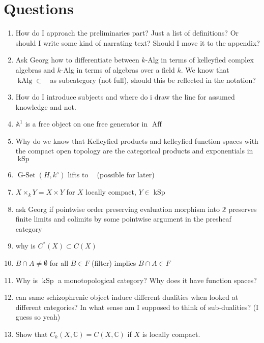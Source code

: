 \documentclass[12pt,a4paper]{article}
\DeclareMathOperator{\Set}{Set}
\DeclareMathOperator{\Frm}{Frm}
\DeclareMathOperator{\Top}{Top}
\DeclareMathOperator{\CAlgk}{CAlg_k}
\DeclareMathOperator{\Aff}{Aff}
\DeclareMathOperator{\kSp}{kSp}
\DeclareMathOperator{\kAlg}{kAlg}
\DeclareMathOperator{\GSet}{G-Set}
\begin{document}
\section{Questions}
\begin{enumerate}
	\item How do I approach the preliminaries part? Just a list of definitions? Or should I write some kind of narrating text? Should I move it to the appendix?
	\item Ask Georg how to differentiate between $k$-Alg in terms of kelleyfied complex algebras and $k$-Alg in terms of algebras over a field $k$. We know that $\kAlg \subset \CAlgk$ as subcategory (not full), should this be reflected in the notation?
	\item How do I introduce subjects and where do i draw the line for assumed knowledge and not.
	\item $\mathbb{A}^1$ is a free object on one free generator in $\Aff$
	\item Why do we know that Kelleyfied products and kelleyfied function spaces with the compact open topology are the categorical products and exponentials in $\kSp$
	\item $\GSet(H, k^s)$ lifts to $\CAlgk$ (possible for later)
	\item $X \times_k Y = X \times Y$ for $X$ locally compact, $Y \in \kSp$
	\item ask Georg if pointwise order preserving evaluation morphism into $\mathbb{2}$ preserves finite limits and colimits by some pointwise argument in the presheaf category
	\item why  is $C^*(X) \subset C(X)$
	\item $B \cap A \neq \emptyset $ for all $B \in F$ (filter) implies $B \cap A \in F$
	\item Why is $\kSp$ a monotopological category? Why does it have function spaces?
	\item can same schizophrenic object induce different dualities when looked at different categories? In what sense am I supposed to think of sub-dualities? (I guess so yeah)
	\item Show that $C_k(X, \mathbb{C}) = C(X, \mathbb{C})$ if $X$ is locally compact.
\end{enumerate}
\end{document}

